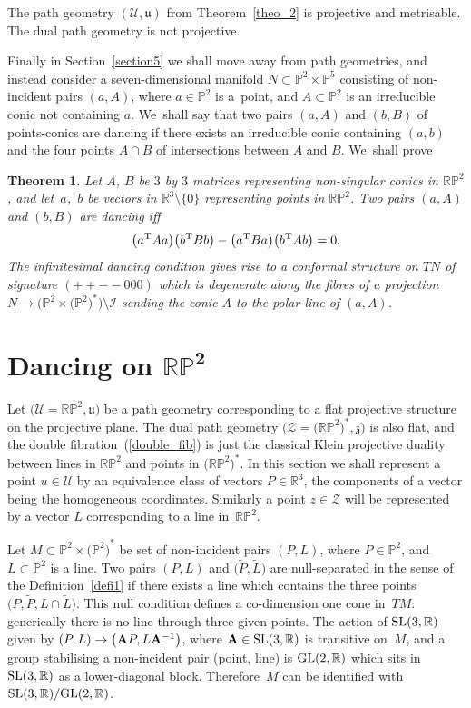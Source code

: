 \documentclass[pdftex]{sigma}%
\numberwithin{equation}{section}
\newtheorem{Theorem}{Theorem}[section]
\newcommand{\Z}{\mathbb{Z}}
\newcommand{\PP}{\mathbb{P}}
\newcommand{\RP}{\mathbb{RP}}
\newcommand{\tL}{\widetilde{L}}
\newcommand{\tP}{\widetilde{P}}
\newcommand{\R}{\mathbb{R}}
\def\u{\mathfrak{u}}
\def\z{\mathfrak{z}}
\def\I{\mathcal{I}}
\renewcommand{\Z}{\mathcal{Z}}
\newcommand{\U}{\mathcal{U}}
\begin{document}
The path geometry $(\U, \u)$ from Theorem~\ref{theo_2} is projective and metrisable. The dual path geometry is not
projective.

Finally in Section~\ref{section5} we shall move away from path geometries, and instead consider
a seven-dimensional
manifold $N\subset \PP^2\times \PP^5$ consisting of non-incident pairs $(a, A)$, where
$a\in \PP^2$ is a~point, and $A\subset \PP^2$ is an irreducible conic not containing $a$. We~shall say
that two pairs $(a, A)$ and $(b, B)$ of points-conics are dancing if there exists an irreducible conic
containing $(a, b)$ and the four points $A\cap B$ of intersections between $A$ and $B$. We~shall prove
\begin{Theorem}
\label{theo3}
Let $A$, $B$ be $3$ by $3$ matrices representing non-singular conics in $\RP^2$, and let~$a$,~$b$ be vectors in $\R^3\setminus\{0\}$ representing points in $\RP^2$.
Two pairs $(a, A)$ and $(b, B)$ are dancing iff
\[
\big(a^{\rm T} A a\big)\big(b^{\rm T}B b\big)-\big(a^{\rm T}Ba\big)\big(b^{\rm T} A b\big)=0.
\]
The infinitesimal dancing condition gives rise to a
conformal structure on $TN$ of signature $(+ + - - 0 0 0 )$
which is degenerate along the fibres of a projection
$N\rightarrow \big(\PP^2\times \big(\PP^2\big)^*\big)\setminus {\I}$ sending the conic
$A$ to the polar line of $(a, A)$.
\end{Theorem}

\section[Dancing on RP\textasciicircum{}2]{Dancing on $\boldsymbol{\RP^2}$}\label{section2}
Let $\big(\U=\RP^2, \u\big)$ be a path geometry corresponding to a flat projective
structure on the projective plane. The dual path geometry
$\big(\Z=\big(\RP^2\big)^*, \z\big)$ is also flat, and the double fibration~(\ref{double_fib}) is just the classical Klein projective duality between
lines in $\RP^2$ and points in $\big(\RP^2\big)^*$. In this section we shall
represent a point $u\in\U$ by an equivalence class
of vectors $P\in \R^3$, the components of a vector being the homogeneous coordinates. Similarly a point $z\in\Z$ will be represented by a vector $L$ corresponding to a line in~$\RP^2$.

Let $M\subset \PP^2\times {\big(\PP^2\big)}^*$ be set of non-incident pairs
$(P, L)$, where $P\in \PP^2$, and $L\subset \PP^2$ is a line. Two pairs $(P, L)$ and $\big(\tP, \tL\big)$ are null-separated in the sense of the Definition~\ref{defi1}
if there exists
a line which contains the three points $\big(P, \tP, L\cap \tL\big)$. This null condition defines a co-dimension one cone in~$TM$:
generically there is no line through three given points.
The action of ${\rm SL}(3, \R)$ given by $(P, L)\rightarrow \big({\bf A}P, L{\bf A}^{-1}\big)$,
where ${\bf A}\in {\rm SL}(3, \R)$
is transitive on~$M$, and a group stabilising a non-incident pair (point, line)
is ${\rm GL}(2, \R)$ which sits in ${\rm SL}(3, \R)$ as a lower-diagonal block. Therefore~$M$
can be identified with ${\rm SL}(3, \R)/{\rm GL}(2, \R)$.
\end{document}
